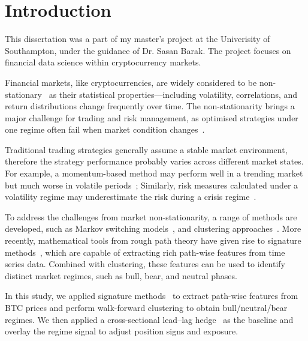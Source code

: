 \chapter{Introduction} \label{Chapter:Introduction}

This dissertation was a part of my master’s project at the Univerisity of Southampton, under the guidance of Dr. Sasan Barak. The project focuses on financial data science within cryptocurrency markets. 

Financial markets, like cryptocurrencies, are widely considered to be non-stationary~\cite{Schmitt_2013,Lo} as their statistical properties—including volatility, correlations, and return distributions change frequently over time.
The non-stationarity brings a major challenge for trading and risk management, as optimised strategies under one regime often fail when market condition changes~\cite{10.1093/rfs/15.4.1137}. 

Traditional trading strategies generally assume a stable market environment, therefore the strategy performance probably varies across different market states. For example, a momentum-based method may perform well in a trending market but much worse in volatile periods~\cite{MOSKOWITZ2012228}; Similarly, risk measures calculated under a volatility regime may underestimate the risk during a crisis regime~\cite{HAMILTON1994307}.

To address the challenges from market non-stationarity, a range of methods are developed, such as Markov switching models~\cite{hamilton1989new}, and clustering approaches~\cite{10.1093/rfs/15.4.1137}. More recently, mathematical tools from rough path theory have given rise to signature methods~\cite{ chevyrev2025primersignaturemethodmachine,issa2023nonparametriconlinemarketregime}, which are capable of extracting rich path-wise features from time series data. Combined with clustering, these features can be used to identify distinct market regimes, such as bull, bear, and neutral phases.

In this study, we applied signature methods~\cite{Lyons1998, chevyrev2025primersignaturemethodmachine,issa2023nonparametriconlinemarketregime} to extract path-wise features from BTC prices and perform walk-forward clustering to obtain bull/neutral/bear regimes. We then applied a cross-sectional lead–lag hedge~\cite{lyons2002system, gatheral2018volatility} as the baseline and overlay the regime signal to adjust position signs and exposure.


